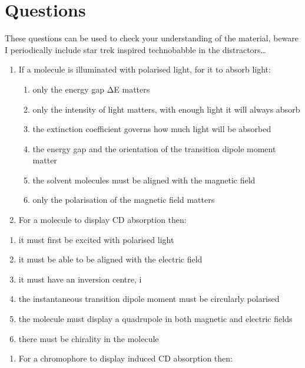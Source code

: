 \documentclass[
]{book}
\providecommand{\tightlist}{%
  \setlength{\itemsep}{0pt}\setlength{\parskip}{0pt}}
\begin{document}
\hypertarget{questions}{%
\section{Questions}\label{questions}}

These questions can be used to check your understanding of the material, beware I periodically include star trek inspired technobabble in the distractors\ldots{}

\begin{enumerate}
\def\labelenumi{\arabic{enumi}.}
\item
  If a molecule is illuminated with polarised light, for it to absorb light:

  \begin{enumerate}
  \def\labelenumii{\alph{enumii}.}
  \tightlist
  \item
    only the energy gap ΔE matters
  \item
    only the intensity of light matters, with enough light it will always absorb
  \item
    the extinction coefficient governs how much light will be absorbed
  \item
    the energy gap and the orientation of the transition dipole moment matter
  \item
    the solvent molecules must be aligned with the magnetic field
  \item
    only the polarisation of the magnetic field matters
  \end{enumerate}
\item
  For a molecule to display CD absorption then:
\end{enumerate}

\begin{enumerate}
\def\labelenumi{\alph{enumi}.}
\tightlist
\item
  it must first be excited with polarised light
\item
  it must be able to be aligned with the electric field
\item
  it must have an inversion centre, i
\item
  the instantaneous transition dipole moment must be circularly polarised
\item
  the molecule must display a quadrupole in both magnetic and electric fields
\item
  there must be chirality in the molecule
\end{enumerate}

\begin{enumerate}
\def\labelenumi{\arabic{enumi}.}
\setcounter{enumi}{2}
\tightlist
\item
  For a chromophore to display induced CD absorption then:
\end{enumerate}
\end{document}
